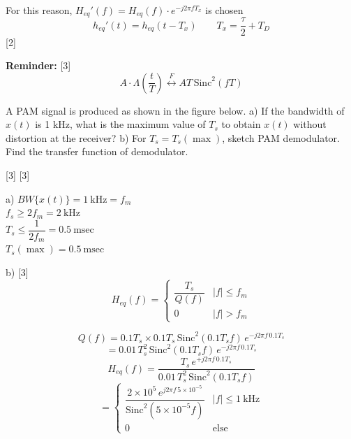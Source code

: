 \documentclass[11pt,a4paper]{article}
\begin{document}
For this reason, $H_{eq}'(f)=H_{eq}(f)\cdot e^{-j2\pi fT_x}$ is chosen
\[ h_{eq}'(t)=h_{eq}(t-T_x)\qquad T_x=\frac{\tau}{2}+T_D \]
[2]

\textbf{Reminder:}
[3]
\[ A\cdot\Lambda\!\left(\frac{t}{T}\right)\overset{F}{\longleftrightarrow}AT\,\mathrm{Sinc}^2(fT) \]

\begin{ornek}[(2004 Midterm Ex. Q.)]
A PAM signal is produced as shown in the figure below. a) If the bandwidth of $x(t)$ is 1 kHz, what is the maximum value of $T_s$ to obtain $x(t)$ without distortion at the receiver? b) For $T_s=T_s(\max)$, sketch PAM demodulator. Find the transfer function of demodulator.
\end{ornek}
[3]
[3]

a) $BW\{x(t)\}=1\ \mathrm{kHz}=f_m$\\
\hspace*{1.2em}$f_s\ge 2f_m=2\ \mathrm{kHz}$\\
\hspace*{1.2em}$T_s\le\dfrac{1}{2f_m}=0.5\ \mathrm{msec}$\\
\hspace*{1.2em}$T_s(\max)=0.5\ \mathrm{msec}$

b)
[3]
\[ H_{eq}(f)=\begin{cases}\dfrac{T_s}{Q(f)} & |f|\le f_m\\[4pt] 0 & |f|>f_m\end{cases} \]

\[ Q(f)=0.1T_s\times0.1T_s\,\mathrm{Sinc}^2(0.1T_sf)\,e^{-j2\pi f\,0.1T_s} \]
\[ =0.01\,T_s^2\,\mathrm{Sinc}^2(0.1T_sf)\,e^{-j2\pi f\,0.1T_s} \]
\[ H_{eq}(f)=\frac{T_s\,e^{+j2\pi f\,0.1T_s}}{0.01\,T_s^2\,\mathrm{Sinc}^2(0.1T_sf)} \]
\[ =\begin{cases}\dfrac{2\times10^{5}\,e^{j2\pi f\,5\times10^{-5}}}{\mathrm{Sinc}^2(5\times10^{-5}f)} & |f|\le 1\ \mathrm{kHz}\\[6pt] 0 & \text{else} \end{cases} \]

\end{document}

